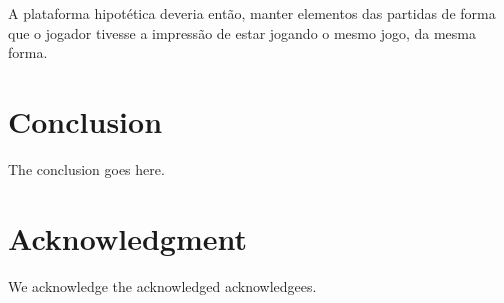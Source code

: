 \documentclass[conference]{IEEEtran}
\begin{document}
A plataforma hipotética deveria então, manter elementos das partidas de forma 
que o jogador tivesse a impressão de estar jogando o mesmo jogo, da mesma forma.

\section{Conclusion}
The conclusion goes here.

\section*{Acknowledgment}
We acknowledge the acknowledged acknowledgees.



\end{document}
